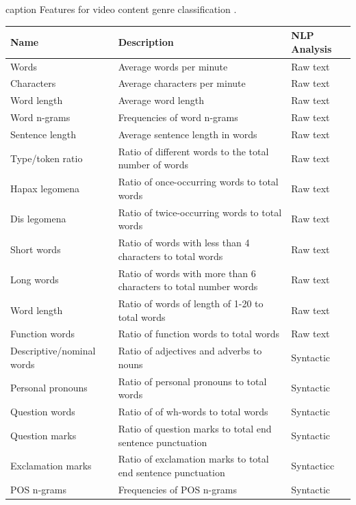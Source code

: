 \begin{table}[t]
	\center
	caption {Features for video content genre classification  \parencite{lee2017text}.}\label{chap:relevant_work:tbl:videogenre_textbased_special_features}
	\begin{tabular}{p{3cm}p{7cm}p{3cm}}
		\hline
		Name & Description & NLP Analysis \\
		\hline
		Words & Average words per minute & Raw text  \\
        Characters & Average characters per minute & Raw text  \\
        Word length & Average word length & Raw text  \\
        Word n-grams & Frequencies of word n-grams & Raw text \\
        Sentence length & Average sentence length in words & Raw text \\
        Type/token ratio & Ratio of different words to the total number of words & Raw text \\
        Hapax legomena & Ratio of once-occurring words to total words  & Raw text  \\
        Dis legomena & Ratio of twice-occurring words to total words & Raw text  \\
        Short words & Ratio of words with less than 4 characters to total words & Raw text  \\
        Long words & Ratio of words with more than 6 characters to total number words & Raw text \\
        Word length & Ratio of words of length of 1-20 to total words & Raw text \\
        Function words & Ratio of function words to total words  & Raw text \\
        Descriptive/nominal words & Ratio of adjectives and adverbs to nouns & Syntactic \\
        Personal pronouns & Ratio of personal pronouns to total words & Syntactic \\
        Question words & Ratio of of wh-words to total words & Syntactic \\
        Question marks & Ratio of question marks to total end sentence punctuation & Syntactic \\
        Exclamation marks & Ratio of exclamation marks to total end sentence punctuation & Syntacticc \\
        POS n-grams & Frequencies of POS n-grams & Syntactic \\
  		\hline
	\end{tabular}
\end{table}

